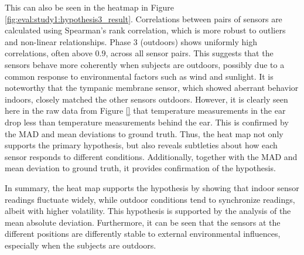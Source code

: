 This can also be seen in the heatmap in Figure \ref{fig:eval:study1:hypothesis3_result}.  
Correlations between pairs of sensors are calculated using Spearman's rank correlation, which is more robust to outliers and non-linear relationships.  
Phase 3 (outdoors) shows uniformly high correlations, often above \(0.9\), across all sensor pairs.  
This suggests that the sensors behave more coherently when subjects are outdoors, possibly due to a common response to environmental factors such as wind and sunlight.  
It is noteworthy that the tympanic membrane sensor, which showed aberrant behavior indoors, closely matched the other sensors outdoors.
However, it is clearly seen here in the raw data from Figure \ref{} that temperature measurements in the ear drop less than temperature measurements behind the ear. 
This is confirmed by the MAD and mean deviations to ground truth. 
Thus, the heat map not only supports the primary hypothesis, but also reveals subtleties about how each sensor responds to different conditions.
Additionally, together with the MAD and mean deviation to ground truth, it provides confirmation of the hypothesis.

In summary, the heat map supports the hypothesis by showing that indoor sensor readings fluctuate widely, while outdoor conditions tend to synchronize readings, albeit with higher volatility.
This hypothesis is supported by the analysis of the mean absolute deviation. 
Furthermore, it can be seen that the sensors at the different positions are differently stable to external environmental influences, especially when the subjects are outdoors.

